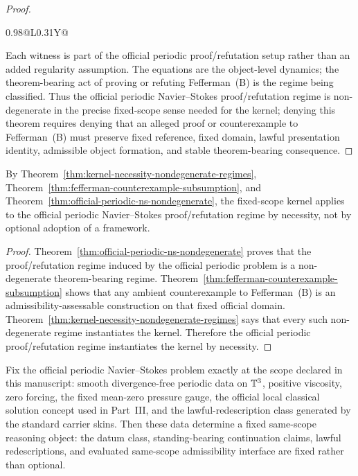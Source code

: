 \begin{proof}
\begin{center}
\begin{tabularx}{0.98\textwidth}{@{}L{0.31\textwidth}Y@{}}
\bottomrule
\end{tabularx}
\end{center}
Each witness is part of the official periodic proof/refutation setup rather than an added regularity assumption. The equations are the object-level dynamics; the theorem-bearing act of proving or refuting Fefferman~(B) is the regime being classified. Thus the official periodic Navier--Stokes proof/refutation regime is non-degenerate in the precise fixed-scope sense needed for the kernel; denying this theorem requires denying that an alleged proof or counterexample to Fefferman~(B) must preserve fixed reference, fixed domain, lawful presentation identity, admissible object formation, and stable theorem-bearing consequence.
\end{proof}

\begin{manualcorollary}
\label{cor:kernel-applies-official-periodic-necessity}
By Theorem~\ref{thm:kernel-necessity-nondegenerate-regimes}, Theorem~\ref{thm:fefferman-counterexample-subsumption}, and Theorem~\ref{thm:official-periodic-ns-nondegenerate}, the fixed-scope kernel applies to the official periodic Navier--Stokes proof/refutation regime by necessity, not by optional adoption of a framework.
\end{manualcorollary}

\begin{proof}
Theorem~\ref{thm:official-periodic-ns-nondegenerate} proves that the proof/refutation regime induced by the official periodic problem is a non-degenerate theorem-bearing regime. Theorem~\ref{thm:fefferman-counterexample-subsumption} shows that any ambient counterexample to Fefferman~(B) is an admissibility-assessable construction on that fixed official domain. Theorem~\ref{thm:kernel-necessity-nondegenerate-regimes} says that every such non-degenerate regime instantiates the kernel. Therefore the official periodic proof/refutation regime instantiates the kernel by necessity.
\end{proof}

\begin{manuallemma}
\label{lem:bridge-fixed-periodic-scope}
Fix the official periodic Navier--Stokes problem exactly at the scope declared in this manuscript: smooth divergence-free periodic data on $\mathbb{T}^3$, positive viscosity, zero forcing, the fixed mean-zero pressure gauge, the official local classical solution concept used in Part~III, and the lawful-redescription class generated by the standard carrier skins. Then these data determine a fixed same-scope reasoning object: the datum class, standing-bearing continuation claims, lawful redescriptions, and evaluated same-scope admissibility interface are fixed rather than optional.
\end{manuallemma}

